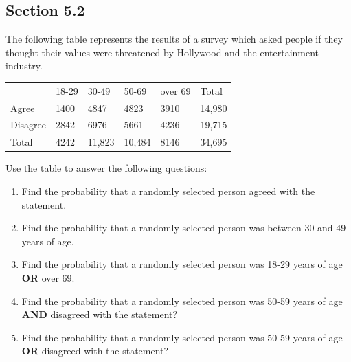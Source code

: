 \documentclass[11pt]{scrartcl}
\theoremstyle{definition}
\begin{document}
\vspace{1cm}
\subsection*{Section 5.2}
The following table represents the results of a survey which asked people if they thought their values were threatened by Hollywood and the entertainment industry.
\begin{center}
	\begin{tabular}{lllll|l}
         & 18-29 & 30-49  & 50-69  & over 69 & Total  \\
Agree    & 1400  & 4847   & 4823   & 3910    & 14,980 \\
Disagree & 2842  & 6976   & 5661   & 4236    & 19,715 \\ \hline
Total    & 4242  & 11,823 & 10,484 & 8146    & 34,695
\end{tabular}
\end{center}
Use the table to answer the following questions:
\begin{enumerate}
	\item Find the probability that a randomly selected person agreed with the statement.
	\item Find the probability that a randomly selected person was between 30 and 49 years of age.
	\item Find the probability that a randomly selected person was 18-29 years of age \textbf{OR} over 69.
	\item Find the probability that a randomly selected person was 50-59 years of age \textbf{AND} disagreed with the statement?
	\item Find the probability that a randomly selected person was 50-59 years of age \textbf{OR} disagreed with the statement? 
\end{enumerate}


\newpage
\end{document}
